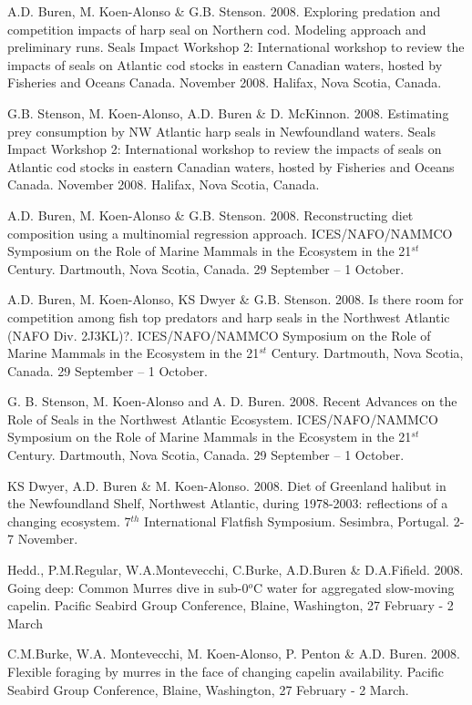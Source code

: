 \documentclass{res}
\begin{document}
\begin{resume}
\begin{hangparas}{.4in}{1}
A.D. Buren, M. Koen-Alonso \& G.B. Stenson. 2008. Exploring predation and competition impacts of harp seal on Northern cod. Modeling approach and preliminary runs. Seals Impact Workshop 2: International workshop to review the impacts of seals on Atlantic cod stocks in eastern Canadian waters, hosted by Fisheries and Oceans Canada. November 2008. Halifax, Nova Scotia, Canada.

G.B. Stenson, M. Koen-Alonso, A.D. Buren \& D. McKinnon. 2008. Estimating prey consumption by NW Atlantic harp seals in Newfoundland waters. Seals Impact Workshop 2: International workshop to review the impacts of seals on Atlantic cod stocks in eastern Canadian waters, hosted by Fisheries and Oceans Canada. November 2008. Halifax, Nova Scotia, Canada.

A.D. Buren, M. Koen-Alonso \& G.B. Stenson. 2008. Reconstructing diet composition using a multinomial regression approach. ICES/NAFO/NAMMCO Symposium on the Role of Marine Mammals in the Ecosystem in the 21$^{st}$ Century. Dartmouth, Nova Scotia, Canada. 29 September – 1 October.

A.D. Buren, M. Koen-Alonso, KS Dwyer \& G.B. Stenson. 2008. Is there room for competition among fish top predators and harp seals in the Northwest Atlantic (NAFO Div. 2J3KL)?. ICES/NAFO/NAMMCO Symposium on the Role of Marine Mammals in the Ecosystem in the 21$^{st}$ Century. Dartmouth, Nova Scotia, Canada. 29 September – 1 October.

G. B. Stenson, M. Koen-Alonso and A. D. Buren. 2008. Recent Advances on the Role of Seals in the Northwest Atlantic Ecosystem. ICES/NAFO/NAMMCO Symposium on the Role of Marine Mammals in the Ecosystem in the 21$^{st}$ Century. Dartmouth, Nova Scotia, Canada. 29 September – 1 October.

KS Dwyer, A.D. Buren \& M. Koen-Alonso. 2008. Diet of Greenland halibut in the Newfoundland Shelf, Northwest Atlantic, during 1978-2003: reflections of a changing ecosystem. 7$^{th}$ International Flatfish Symposium. Sesimbra, Portugal. 2-7 November.

Hedd., P.M.Regular, W.A.Montevecchi, C.Burke, A.D.Buren \& D.A.Fifield. 2008. Going deep: Common Murres dive in sub-0$^{o}$C water for aggregated slow-moving capelin. Pacific Seabird Group Conference, Blaine, Washington, 27 February - 2 March

C.M.Burke, W.A. Montevecchi, M. Koen-Alonso, P. Penton \& A.D. Buren. 2008. Flexible foraging by murres in the face of changing capelin availability. Pacific Seabird Group Conference, Blaine, Washington, 27 February - 2 March.


\end{hangparas}
\end{resume}
\end{document}
